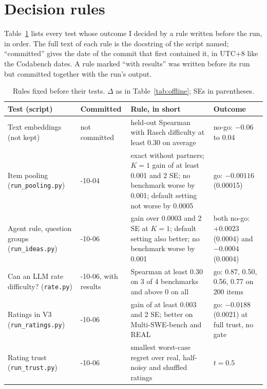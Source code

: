\section{Decision rules}\label{app:rules}

Table~\ref{tab:rules} lists every test whose outcome I decided by a rule written before the run, in order. The full text of each rule is the docstring of the script named; ``committed'' gives the date of the commit that first contained it, in UTC+8 like the Codabench dates. A rule marked ``with results'' was written before its run but committed together with the run's output.

\begin{table}[h]
  \caption{Rules fixed before their tests. $\Delta$ as in Table~\ref{tab:offline}; SEs in parentheses.}
  \label{tab:rules}
  \centering
  \small
  \setlength{\tabcolsep}{4pt}
  \begin{tabular}{>{\raggedright\arraybackslash}p{3.6cm}>{\raggedright\arraybackslash}p{1.75cm}>{\raggedright\arraybackslash}p{4.2cm}>{\raggedright\arraybackslash}p{3.05cm}}
    \toprule
    Test (script) & Committed & Rule, in short & Outcome \\
    \midrule
    Text embeddings (not kept) & not committed & held-out Spearman with Rasch difficulty at least 0.30 on average & no-go: $-0.06$ to 0.04 \\
    Item pooling (\texttt{run\_pooling.py}) & 2026-10-04 & exact without partners; $K = 1$ gain of at least 0.001 and 2 SE; no benchmark worse by 0.001; default setting not worse by 0.0005 & go: $-0.00116$ (0.00015) \\
    Agent rule, question groups (\texttt{run\_ideas.py}) & 2026-10-06 & gain over 0.0003 and 2 SE at $K = 1$; default setting also better; no benchmark worse by 0.001 & both no-go: $+0.0023$ (0.0004) and $-0.0004$ (0.0004) \\
    Can an LLM rate difficulty? (\texttt{rate.py}) & 2026-10-06, with results & Spearman at least 0.30 on 3 of 4 benchmarks and above 0 on all & go: 0.87, 0.50, 0.56, 0.77 on 200 items \\
    Ratings in V3 (\texttt{run\_ratings.py}) & 2026-10-06 & gain of at least 0.003 and 2 SE; better on Multi-SWE-bench and REAL & go: $-0.0188$ (0.0021) at full trust, no gate \\
    Rating trust (\texttt{run\_trust.py}) & 2026-10-06 & smallest worst-case regret over real, half-noisy and shuffled ratings & $t = 0.5$ \\

\end{tabular}
\end{table}
